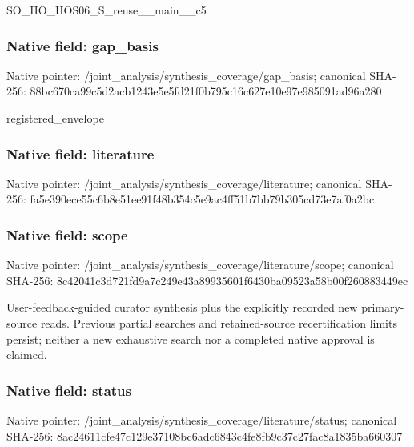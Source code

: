 \documentclass[10pt,a4paper]{article}
\begin{document}
\begingroup\raggedright\sloppy SO\_\allowbreak{}HO\_\allowbreak{}HOS06\_\allowbreak{}S\_\allowbreak{}reuse\_\allowbreak{}\_\allowbreak{}main\_\allowbreak{}\_\allowbreak{}c5\par\endgroup

\subsubsection{Native field: gap\_\allowbreak{}basis}
Native pointer: /joint\_\allowbreak{}analysis/synthesis\_\allowbreak{}coverage/gap\_\allowbreak{}basis; canonical SHA-256: 88bc670ca99c5d2acb1243e5e5fd21f0b795c16c627e10e97e985091ad96a280

\begingroup\raggedright\sloppy registered\_\allowbreak{}envelope\par\endgroup

\subsubsection{Native field: literature}
Native pointer: /joint\_\allowbreak{}analysis/synthesis\_\allowbreak{}coverage/literature; canonical SHA-256: fa5e390ece55c6b8e51ee91f48b354c5e9ac4ff51b7bb79b305cd73e7af0a2bc

\subsubsection{Native field: scope}
Native pointer: /joint\_\allowbreak{}analysis/synthesis\_\allowbreak{}coverage/literature/scope; canonical SHA-256: 8c42041c3d721fd9a7c249e43a89935601f6430ba09523a58b00f260883449ec

\begingroup\raggedright\sloppy User-feedback-guided curator synthesis plus the explicitly recorded new primary-source reads. Previous partial searches and retained-source recertification limits persist;\allowbreak{} neither a new exhaustive search nor a completed native approval is claimed.\par\endgroup

\subsubsection{Native field: status}
Native pointer: /joint\_\allowbreak{}analysis/synthesis\_\allowbreak{}coverage/literature/status; canonical SHA-256: 8ac24611cfe47c129e37108bc6adc6843c4fe8fb9c37c27fac8a1835ba660307
\end{document}
